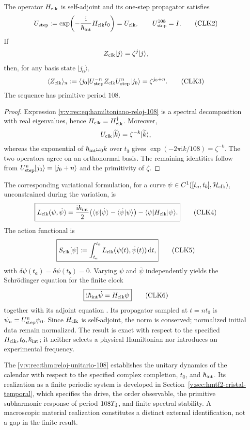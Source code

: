 \begin{theorem}
\label{v:v:rec:thm:reloj-unitario-108}
The operator \(H_{\rm clk}\) is self-adjoint and its one-step propagator
satisfies
\[
 U_{\rm step}
 :=\exp\!\left(-\frac{\mathrm i}{\hbar_{\rm int}}
 H_{\rm clk}t_0\right)
 =U_{\rm clk},
 \qquad
 U_{\rm step}^{108}=I.
 \tag{CLK2}\label{v:v:rec:eq:propagador-reloj-108}
\]
If
\[
 Z_{\rm clk}|j\rangle=\zeta^j|j\rangle,
\]
then, for any basis state \(|j_0\rangle\),
\[
 \langle Z_{\rm clk}\rangle_{n}
 :=\langle j_0|U_{\rm step}^{-n}Z_{\rm clk}
 U_{\rm step}^n|j_0\rangle
 =\zeta^{j_0+n}.
 \tag{CLK3}\label{v:v:rec:eq:respuesta-reloj-108}
\]
The sequence has primitive period \(108\).
\end{theorem}

\begin{proof}
Expression \eqref{v:v:rec:eq:hamiltoniano-reloj-108} is a spectral
decomposition with real eigenvalues, hence \(H_{\rm clk}=H_{\rm clk}^\dagger\).
Moreover,
\[
 U_{\rm clk}|\widetilde k\rangle
 =\zeta^{-k}|\widetilde k\rangle,
\]
whereas the exponential of
\(\hbar_{\rm int}\omega_0 k\) over \(t_0\) gives
\(\exp(-2\pi\mathrm ik/108)=\zeta^{-k}\). The two operators agree on
an orthonormal basis. The remaining identities follow from
\(U_{\rm step}^n|j_0\rangle=|j_0+n\rangle\) and the primitivity of
\(\zeta\).
\end{proof}

The corresponding variational formulation, for a curve
\(\psi\in C^1([t_a,t_b],\mathcal H_{\rm clk})\), unconstrained during the
variation, is
\[
 \boxed{
 L_{\rm clk}(\psi,\dot\psi)
 =\frac{\mathrm i\hbar_{\rm int}}2
 \bigl(
 \langle\psi|\dot\psi\rangle
 -\langle\dot\psi|\psi\rangle
 \bigr)
 -\langle\psi|H_{\rm clk}|\psi\rangle.}
 \tag{CLK4}\label{v:v:rec:eq:lagrangiano-reloj-108}
\]
The action functional is
\[
 \boxed{
 S_{\rm clk}[\psi]
 :=\int_{t_a}^{t_b}
 L_{\rm clk}(\psi(t),\dot\psi(t))\,\mathrm dt,}
 \tag{CLK5}\label{v:v:rec:eq:accion-reloj-108}
\]
with \(\delta\psi(t_a)=\delta\psi(t_b)=0\).
Varying \(\psi\) and \(\bar\psi\) independently yields the
Schrödinger equation for the finite clock
\[
 \boxed{\mathrm i\hbar_{\rm int}\dot\psi=H_{\rm clk}\psi}
 \tag{CLK6}\label{v:v:rec:eq:schrodinger-reloj-108}
\]
together with its adjoint equation \cite{v:SchrodingerNobel}. Its propagator sampled
at \(t=nt_0\) is \(\psi_n=U_{\rm step}^{n}\psi_0\). Since \(H_{\rm clk}\) is
self-adjoint, the norm is conserved; normalized initial data remain
normalized. The result is exact with respect to the specified
\(H_{\rm clk},t_0,\hbar_{\rm int}\); it neither selects a physical Hamiltonian
nor introduces an experimental frequency.

The \cref{v:v:rec:thm:reloj-unitario-108} establishes the unitary dynamics of the calendar
with respect to the specified complex completion, \(t_0\), and \(\hbar_{\rm int}\).
Its realization as a finite periodic system is developed
in Section~\ref{v:sec:hmtf2-cristal-temporal}, which
specifies the drive, the order observable, the primitive subharmonic response of period
\(108T_{\rm d}\), and finite spectral stability. A
macroscopic material realization constitutes a distinct external identification, not a
gap in the finite result.
